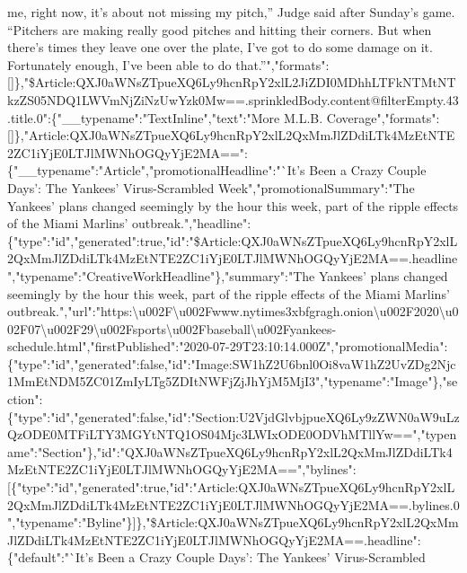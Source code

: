 me, right now, it's about not missing my pitch,'' Judge said after
Sunday's game. ``Pitchers are making really good pitches and hitting
their corners. But when there's times they leave one over the plate,
I've got to do some damage on it. Fortunately enough, I've been able to
do
that.''","formats":{[}{]}\},"\$Article:QXJ0aWNsZTpueXQ6Ly9hcnRpY2xlL2JiZDI0MDhhLTFkNTMtNTkzZS05NDQ1LWVmNjZiNzUwYzk0Mw==.sprinkledBody.content@filterEmpty.43.title.0":\{"\_\_typename":"TextInline","text":"More
M.L.B.
Coverage","formats":{[}{]}\},"Article:QXJ0aWNsZTpueXQ6Ly9hcnRpY2xlL2QxMmJlZDdiLTk4MzEtNTE2ZC1iYjE0LTJlMWNhOGQyYjE2MA==":\{"\_\_typename":"Article","promotionalHeadline":"`It's
Been a Crazy Couple Days': The Yankees' Virus-Scrambled
Week","promotionalSummary":"The Yankees' plans changed seemingly by the
hour this week, part of the ripple effects of the Miami Marlins'
outbreak.","headline":\{"type":"id","generated":true,"id":"\$Article:QXJ0aWNsZTpueXQ6Ly9hcnRpY2xlL2QxMmJlZDdiLTk4MzEtNTE2ZC1iYjE0LTJlMWNhOGQyYjE2MA==.headline","typename":"CreativeWorkHeadline"\},"summary":"The
Yankees' plans changed seemingly by the hour this week, part of the
ripple effects of the Miami Marlins'
outbreak.","url":"https:\textbackslash{}u002F\textbackslash{}u002Fwww.nytimes3xbfgragh.onion\textbackslash{}u002F2020\textbackslash{}u002F07\textbackslash{}u002F29\textbackslash{}u002Fsports\textbackslash{}u002Fbaseball\textbackslash{}u002Fyankees-schedule.html","firstPublished":"2020-07-29T23:10:14.000Z","promotionalMedia":\{"type":"id","generated":false,"id":"Image:SW1hZ2U6bnl0Oi8vaW1hZ2UvZDg2Njc1MmEtNDM5ZC01ZmIyLTg5ZDItNWFjZjJhYjM5MjI3","typename":"Image"\},"section":\{"type":"id","generated":false,"id":"Section:U2VjdGlvbjpueXQ6Ly9zZWN0aW9uLzQzODE0MTFiLTY3MGYtNTQ1OS04Mjc3LWIxODE0ODVhMTllYw==","typename":"Section"\},"id":"QXJ0aWNsZTpueXQ6Ly9hcnRpY2xlL2QxMmJlZDdiLTk4MzEtNTE2ZC1iYjE0LTJlMWNhOGQyYjE2MA==","bylines":{[}\{"type":"id","generated":true,"id":"Article:QXJ0aWNsZTpueXQ6Ly9hcnRpY2xlL2QxMmJlZDdiLTk4MzEtNTE2ZC1iYjE0LTJlMWNhOGQyYjE2MA==.bylines.0","typename":"Byline"\}{]}\},"\$Article:QXJ0aWNsZTpueXQ6Ly9hcnRpY2xlL2QxMmJlZDdiLTk4MzEtNTE2ZC1iYjE0LTJlMWNhOGQyYjE2MA==.headline":\{"default":"`It's
Been a Crazy Couple Days': The Yankees' Virus-Scrambled
